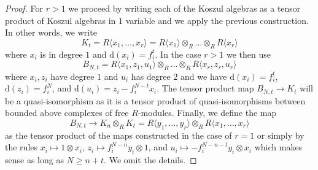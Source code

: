 \documentclass{stacks-project}
\theoremstyle{plain}
\theoremstyle{definition}
\theoremstyle{remark}
\numberwithin{equation}{subsection}
\begin{document}
\begin{proof}
\medskip\noindent
For $r > 1$ we proceed by writing each of the Koszul algebras as a
tensor product of Koszul algebras in $1$ variable and we apply the
previous construction. In other words, we write
$$
K_t = R\langle x_1, \ldots, x_r\rangle =
R\langle x_1\rangle \otimes_R \ldots \otimes_R R\langle x_r\rangle
$$
where $x_i$ is in degree $1$ and $\text{d}(x_i) = f_i^t$.
In the case $r > 1$ we then use
$$
B_{N, t} =
R\langle x_1, z_1, u_1 \rangle
\otimes_R \ldots \otimes_R
R\langle x_r, z_r, u_r \rangle
$$
where $x_i, z_i$ have degree $1$ and $u_i$ has degree $2$ and we have
$\text{d}(x_i) = f_i^t$, $\text{d}(z_i) = f_i^N$, and
$\text{d}(u_i) = z_i - f_i^{N - t}x_i$.
The tensor product map $B_{N, t} \to K_t$ will be a quasi-isomorphism
as it is a tensor product of quasi-isomorphisms between bounded above
complexes of free $R$-modules. Finally, we define the map
$$
B_{N, t}
\to
K_n \otimes_R K_t =
R\langle y_1, \ldots, y_r\rangle \otimes_R
R\langle x_1, \ldots, x_r\rangle
$$
as the tensor product of the maps constructed in the case of $r = 1$
or simply by the rules $x_i \mapsto 1 \otimes x_i$,
$z_i \mapsto f_i^{N - n}y_i \otimes 1$, and
$u_i \mapsto - f_i^{N - n - t}y_i \otimes x_i$ which makes
sense as long as $N \geq n + t$. We omit the details.
\end{proof}












\end{document}

